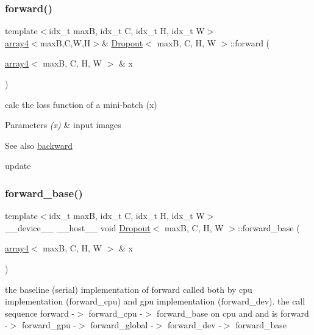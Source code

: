 \subsubsection{\texorpdfstring{forward()}{forward()}}
{\footnotesize\ttfamily template$<$idx\+\_\+t maxB, idx\+\_\+t C, idx\+\_\+t H, idx\+\_\+t W$>$ \\
\hyperlink{structarray4}{array4}$<$maxB,C,W,H$>$\& \hyperlink{structDropout}{Dropout}$<$ maxB, C, H, W $>$\+::forward (\begin{DoxyParamCaption}\item[{\hyperlink{structarray4}{array4}$<$ maxB, C, H, W $>$ \&}]{x }\end{DoxyParamCaption})\hspace{0.3cm}{\ttfamily [inline]}}



calc the loss function of a mini-\/batch (x) 


\begin{DoxyParams}{Parameters}
{\em (x)} & input images \\
\hline
\end{DoxyParams}
\begin{DoxySeeAlso}{See also}
\hyperlink{structDropout_afe1afe7ce80e59d1b48c820a724aae1b}{backward} 

update 
\end{DoxySeeAlso}
\mbox{\label{structDropout_a8d7db70a48a4c2e3887c931b099f1160}} 
\subsubsection{\texorpdfstring{forward\+\_\+base()}{forward\_base()}}
{\footnotesize\ttfamily template$<$idx\+\_\+t maxB, idx\+\_\+t C, idx\+\_\+t H, idx\+\_\+t W$>$ \\
\+\_\+\+\_\+device\+\_\+\+\_\+ \+\_\+\+\_\+host\+\_\+\+\_\+ void \hyperlink{structDropout}{Dropout}$<$ maxB, C, H, W $>$\+::forward\+\_\+base (\begin{DoxyParamCaption}\item[{\hyperlink{structarray4}{array4}$<$ maxB, C, H, W $>$ \&}]{x }\end{DoxyParamCaption})\hspace{0.3cm}{\ttfamily [inline]}}



the baseline (serial) implementation of forward called both by cpu implementation (forward\+\_\+cpu) and gpu implementation (forward\+\_\+dev). the call sequence forward -\/$>$ forward\+\_\+cpu -\/$>$ forward\+\_\+base on cpu and and is forward -\/$>$ forward\+\_\+gpu -\/$>$ forward\+\_\+global -\/$>$ forward\+\_\+dev -\/$>$ forward\+\_\+base 


